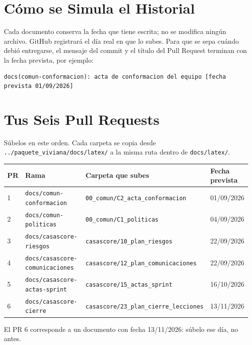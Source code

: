 \documentclass[11pt,a4paper]{article}
\begin{document}
\section{Cómo se Simula el Historial}
Cada documento conserva la fecha que tiene escrita; no se modifica ningún archivo. GitHub registrará el día real en que lo subes. Para que se sepa cuándo debió entregarse, el mensaje del commit y el título del Pull Request terminan con la fecha prevista, por ejemplo:

\begin{lstlisting}
docs(comun-conformacion): acta de conformacion del equipo [fecha prevista 01/09/2026]
\end{lstlisting}

\section{Tus Seis Pull Requests}
Súbelos en este orden. Cada carpeta se copia desde \nolinkurl{../paquete_viviana/docs/latex/} a la misma ruta dentro de \nolinkurl{docs/latex/}.

\vspace{0.1cm}
{\small
{}
\noindent\begin{tabularx}{\textwidth}{@{}C{0.6cm} P{4.6cm} L C{1.8cm}@{}}
\toprule
{}
\textbf{PR} & \textbf{Rama} & \textbf{Carpeta que subes} & \textbf{Fecha prevista} \\
 & \nolinkurl{docs/comun-conformacion} & \nolinkurl{00_comun/C2_acta_conformacion} & 01/09/2026 \\
2 & \nolinkurl{docs/comun-politicas} & \nolinkurl{00_comun/C1_politicas} & 04/09/2026 \\
3 & \nolinkurl{docs/casascore-riesgos} & \nolinkurl{casascore/10_plan_riesgos} & 22/09/2026 \\
4 & \nolinkurl{docs/casascore-comunicaciones} & \nolinkurl{casascore/12_plan_comunicaciones} & 22/09/2026 \\
5 & \nolinkurl{docs/casascore-actas-sprint} & \nolinkurl{casascore/15_actas_sprint} & 16/10/2026 \\
6 & \nolinkurl{docs/casascore-cierre} & \nolinkurl{casascore/23_plan_cierre_lecciones} & 13/11/2026 \\
\bottomrule
\end{tabularx}
}

\vspace{0.1cm}
\noindent El PR 6 corresponde a un documento con fecha 13/11/2026: súbelo ese día, no antes.
\end{document}
